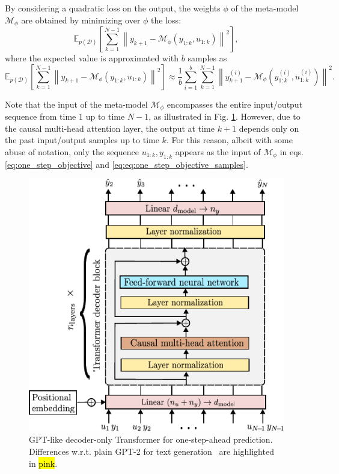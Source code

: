 \documentclass{article}
\newcommand{\free}{\mathcal{M}}
\newcommand{\D}{\mathcal{D}}
\newcommand{\nsamp}{N}
\newcommand{\norm}[1]{\left\lVert#1\right\rVert}
\newcommand{\E}{\mathbb{E}}
\begin{document}
By considering a quadratic loss on the output, the  weights $\phi$ of the meta-model $\free_{\phi}$ are obtained by minimizing over $\phi$ the loss:
\begin{equation}
	\label{eq:one_step_objective}
     \E_{p(\D)} 
    \left [ \sum_{k=1}^{\nsamp-1}
    \norm{y_{k+1} -
    \free_\phi (y_{1:k}, u_{1:k})
    }^2
    \right ],
\end{equation}
where the expected value is approximated with $b$ samples as
\begin{equation}
	\label{eq:eq:one_step_objective_samples}
\E_{p(\D)} 
    \left [ \sum_{k=1}^{\nsamp-1}
    \norm{y_{k+1} -
    \free_\phi (y_{1:k}, u_{1:k})
    }^2
    \right ]
    \approx \frac{1}{b}
    \sum_{i=1}^b
    \sum_{k=1}^{\nsamp-1}
    \norm{y_{k+1}^{(i)} -
    \free_\phi (y^{(i)}_{1:k}, u_{1:k}^{(i)})}^2
    .
\end{equation}

Note that the input of the meta-model $\free_\phi$ encompasses the entire input/output sequence from time $1$ up to time $N-1$, as illustrated in Fig. \ref{fig:decoder_only_arch}. However, due to the causal multi-head attention layer, the output at time $k+1$ depends only on the past input/output samples up to time $k$. For this reason, albeit with some abuse of notation, only the sequence $u_{1:k}, y_{1:k}$ appears as the input of $\free_\phi$ in eqs. \eqref{eq:one_step_objective} and \eqref{eq:eq:one_step_objective_samples}.



\begin{figure}[!bt]
\includegraphics[width=.8\textwidth]{fig/architecture/decoder_architecture.pdf}
\caption{GPT-like decoder-only Transformer   for one-step-ahead prediction. Differences w.r.t. plain GPT-2 for text generation~\cite{radford2019language, nanoGPT} are highlighted in \hl{pink}.}
\label{fig:decoder_only_arch}
\end{figure}
\end{document}
